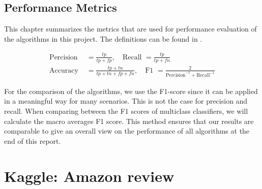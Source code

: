 \documentclass[11pt]{article}
\begin{document}
\subsection{Performance Metrics}

This chapter summarizes the metrics that are used for performance evaluation of the algorithms in this project. The definitions can be found in \cite{shalev2014}.

\begin{align}
\text{Percision } &= \frac{tp}{tp+fp}, \quad \text{Recall } = \frac{tp}{tp+fn}\\ 
\text{Accuracy } &= \frac{tp+tn}{tp+tn+fp+fn}, \quad \text{F1 } = \frac{2}{\text{Percision}^{-1}+ \text{Recall}^{-1}}
\end{align}

For the comparison of the algorithms, we use the F1-score since it can be applied in a meaningful way for many scenarios. This is not the case for precision and recall. When comparing between the F1 scores of multiclass classifiers, we will calculate the macro averages F1 score. This method ensures that our results are comparable to give an overall view on the performance of all algorithms at the end of this report.

\section{Kaggle: Amazon review}
\end{document}
